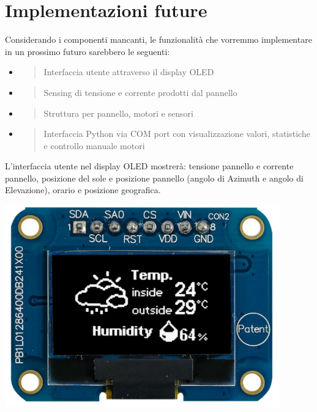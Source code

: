 \chapter{Implementazioni future}

Considerando i componenti mancanti, le funzionalità che vorremmo
implementare in un prossimo futuro sarebbero le seguenti:

\begin{itemize}
\item
  \begin{quote}
  Interfaccia utente attraverso il display OLED
  \end{quote}
\item
  \begin{quote}
  Sensing di tensione e corrente prodotti dal pannello
  \end{quote}
\item
  \begin{quote}
  Struttura per pannello, motori e sensori
  \end{quote}
\item
  \begin{quote}
  Interfaccia Python via COM port con visualizzazione valori,
  statistiche e controllo manuale motori
  \end{quote}
\end{itemize}

\noindent L'interfaccia utente nel display OLED mostrerà: tensione pannello e
corrente pannello, posizione del sole e posizione pannello (angolo di
Azimuth e angolo di Elevazione), orario e posizione geografica.

\begin{center}
\includegraphics[width=4.68229in,height=3.4426in]{figures/image27.png}
\captionsetup{type=figure}
\end{center}

